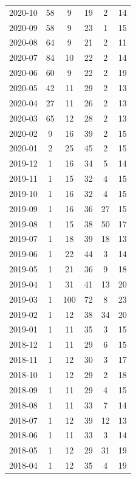 \documentclass[12pt]{report}
\begin{document}
\begin{longtable}{|c|c|c|c|c|c|}
            2020-10 & 58 & 9 & 19 & 2 & 14 \\
            2020-09 & 58 & 9 & 23 & 1 & 15 \\
            2020-08 & 64 & 9 & 21 & 2 & 11 \\
            2020-07 & 84 & 10 & 22 & 2 & 14 \\
            2020-06 & 60 & 9 & 22 & 2 & 19 \\
            2020-05 & 42 & 11 & 29 & 2 & 13 \\
            2020-04 & 27 & 11 & 26 & 2 & 13 \\
            2020-03 & 65 & 12 & 28 & 2 & 13 \\
            2020-02 & 9 & 16 & 39 & 2 & 15 \\
            2020-01 & 2 & 25 & 45 & 2 & 15 \\
            2019-12 & 1 & 16 & 34 & 5 & 14 \\
            2019-11 & 1 & 15 & 32 & 4 & 15 \\
            2019-10 & 1 & 16 & 32 & 4 & 15 \\
            2019-09 & 1 & 16 & 36 & 27 & 15 \\
            2019-08 & 1 & 15 & 38 & 50 & 17 \\
            2019-07 & 1 & 18 & 39 & 18 & 13 \\
            2019-06 & 1 & 22 & 44 & 3 & 14 \\
            2019-05 & 1 & 21 & 36 & 9 & 18 \\
            2019-04 & 1 & 31 & 41 & 13 & 20 \\
            2019-03 & 1 & 100 & 72 & 8 & 23 \\
            2019-02 & 1 & 12 & 38 & 34 & 20 \\
            2019-01 & 1 & 11 & 35 & 3 & 15 \\
            2018-12 & 1 & 11 & 29 & 6 & 15 \\
            2018-11 & 1 & 12 & 30 & 3 & 17 \\
            2018-10 & 1 & 12 & 29 & 2 & 18 \\
            2018-09 & 1 & 11 & 29 & 4 & 15 \\
            2018-08 & 1 & 11 & 33 & 7 & 14 \\
            2018-07 & 1 & 12 & 39 & 12 & 13 \\
            2018-06 & 1 & 11 & 33 & 3 & 14 \\
            2018-05 & 1 & 12 & 29 & 31 & 19 \\
            2018-04 & 1 & 12 & 35 & 4 & 19 \\

\end{longtable}
\end{document}
